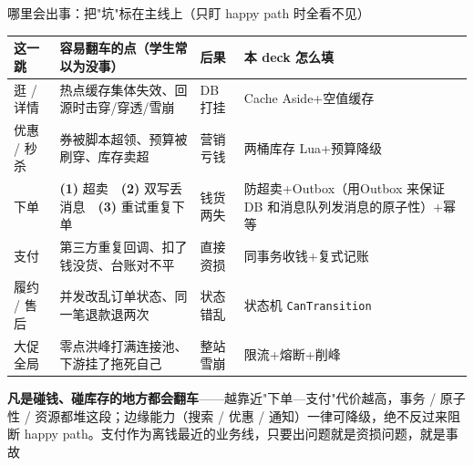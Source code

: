 \documentclass[aspectratio=169,11pt]{beamer}
\begin{document}
\begin{frame}[t,shrink=8]{哪里会出事：把"坑"标在主线上（只盯 happy path 时全看不见）}
\vspace{0.3em}
\begin{center}
\scriptsize
\setlength{\tabcolsep}{4pt}
\renewcommand{\arraystretch}{1.4}
\begin{tabular}{@{}p{}p{}p{}p{}@{}}
\toprule
\textbf{这一跳} & \textbf{容易翻车的点（学生常以为没事）} & \textbf{后果} & \textbf{本 deck 怎么填} \\
\midrule
逛 / 详情 & 热点缓存集体失效、回源时击穿/穿透/雪崩 & DB 打挂 & Cache Aside+空值缓存 \\
优惠 / 秒杀 & 券被脚本超领、预算被刷穿、库存卖超 & 营销亏钱 & 两桶库存 Lua+预算降级 \\
下单 & \textbf{(1)} 超卖\ \ \textbf{(2)} 双写丢消息\ \ \textbf{(3)} 重试重复下单 & 钱货两失 & 防超卖+Outbox（用Outbox 来保证DB 和消息队列发消息的原子性）+幂等 \\
支付 & 第三方重复回调、扣了钱没货、台账对不平 & 直接资损 & 同事务收钱+复式记账 \\
履约 / 售后 & 并发改乱订单状态、同一笔退款退两次 & 状态错乱 & 状态机 \texttt{CanTransition} \\
大促全局 & 零点洪峰打满连接池、下游挂了拖死自己 & 整站雪崩 & 限流+熔断+削峰 \\
\bottomrule
\end{tabular}
\end{center}
\vspace{0.5em}
{\small \textbf{凡是碰钱、碰库存的地方都会翻车}——越靠近"下单—支付"代价越高，事务 / 原子性 / 资源都堆这段；边缘能力（搜索 / 优惠 / 通知）一律可降级，绝不反过来阻断 happy path。支付作为离钱最近的业务线，只要出问题就是资损问题，就是事故\par}
\vspace{0.4em}
\end{frame}
\end{document}
